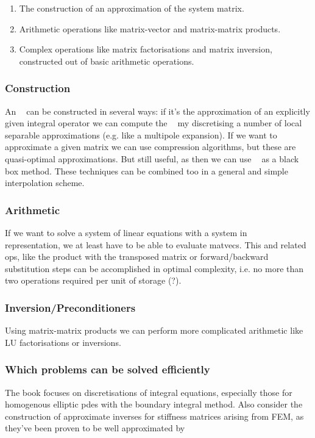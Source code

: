 \documentclass[12pt, a4, twoside]{article}
\DeclareMathOperator\htwomat{\mathcal{H}^2}
\begin{document}
\begin{enumerate}
    \item The construction of an approximation of the system matrix.
    \item Arithmetic operations like matrix-vector and matrix-matrix products.
    \item Complex operations like matrix factorisations and matrix inversion, constructed out of basic arithmetic operations.
\end{enumerate}

\subsubsection*{Construction}

An $\htwomat$ can be constructed in several ways: if it's the approximation of an explicitly given integral operator we can compute the $\htwomat$ my discretising a number of local separable approximations (e.g. like a multipole expansion).  If we want to approximate a given matrix we can use compression algorithms, but these are quasi-optimal approximations. But still useful, as then we can use $\htwomat$ as a black box method. These techniques can be combined too in a general and simple interpolation scheme.

\subsubsection*{Arithmetic}
If we want to solve a system of linear equations with a system in $\htwomat$ representation, we at least have to be able to evaluate matvecs. This and related ops, like the product with the transposed matrix or forward/backward substitution steps can be accomplished in optimal complexity, i.e. no more than two operations required per unit of storage (?).

\subsubsection*{Inversion/Preconditioners}
Using matrix-matrix products we can perform more complicated arithmetic like LU factorisations or inversions.

\subsubsection*{Which problems can be solved efficiently}

The book focuses on discretisations of integral equations, especially those for homogenous elliptic pdes with the boundary integral method. Also consider the construction of approximate inverses for stiffness matrices arising from FEM, as they've been proven to be well approximated by $\htwomat$


\printbibliography
\end{document}

